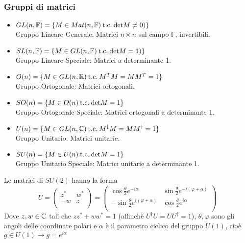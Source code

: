 \subsubsection{Gruppi di matrici}
\begin{itemize}
   \item $GL(n,\mathbb{F}) = \{M \in Mat(n,\mathbb{F}) \mathrm{\: t.c. \:} \mathrm{det} M \neq 0)\}$\\
      \ttab Gruppo Lineare Generale: Matrici $n \times n$ sul campo $\mathbb{F}$,
      invertibili.

   \item $SL(n,\mathbb{F}) = \{ M \in GL(n,\mathbb{F}) \mathrm{\: t.c. \:} \mathrm{det} M = 1)\}$\\
      \ttab Gruppo Lineare Speciale: Matrici a determinante 1.

   \item $O(n) = \{ M \in GL(n,\mathbb{R}) \mathrm{\: t.c. \:}  M^T M = M M^T = 1 \}$\\
      \ttab Gruppo Ortogonale: Matrici ortogonali.

   \item $SO(n) = \{ M \in O(n)\mathrm{\: t.c. \:} \mathrm{det} M  = 1  \}$\\
      \ttab Gruppo Ortogonale Speciale: Matrici ortogonali a determinante 1.

   \item $U(n) = \{ M \in GL(n,\mathbb{C})\mathrm{\: t.c. \:} M^\dagger M = M M^\dagger = 1\}$\\
      \ttab Gruppo Unitario: Matrici unitarie.

   \item $SU(n) = \{ M \in U(n)\mathrm{\: t.c. \:} \mathrm{det}M = 1  \}$\\
      \ttab Gruppo Unitario Speciale: Matrici unitarie a determinante 1.
\end{itemize}

Le matrici di $SU(2)$ hanno la forma
\begin{equation}\label{eq:matSU2}
   U =
        \begin{pmatrix}
          z^* & w^* \\
          -w  & z   \\
        \end{pmatrix}
     =
       \begin{pmatrix}
          \cos \frac{\theta}{2} e^{-i\alpha} & \sin \frac{\theta}{2} e^{-i(\varphi + \alpha)} \\
         -\sin \frac{\theta}{2} e^{i(\varphi + \alpha)} & \cos \frac{\theta}{2} e^{i\alpha}  \\
       \end{pmatrix}
\end{equation}
Dove $z,w \in \mathbb{C}$ tali che $zz^* + ww^* = 1$
(affinchè $U^\dagger U = UU^\dagger = 1$), $\theta,\varphi$ sono gli angoli delle
coordinate polari e $\alpha$ è il parametro ciclico del gruppo $U(1)$, cioè
$g \in U(1) \to g = e^{i\alpha}$

